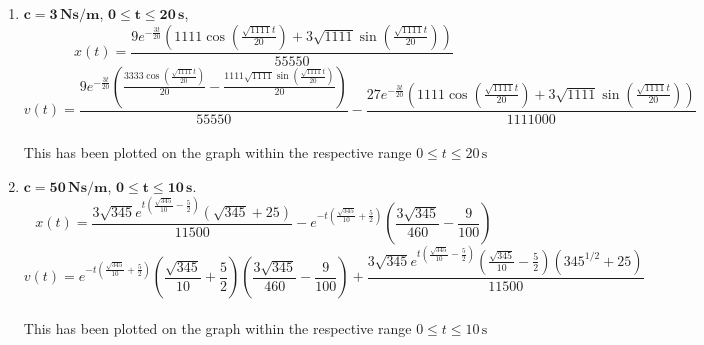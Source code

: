 \documentclass[a4paper, 12pt]{report}
\begin{document}
    \begin{enumerate}[itemsep=1em,label=\textbf{\arabic*.}]
    \item \(\bm{c = 3} \, \textbf{Ns/m}\), \(\bm{0 \leq t \leq 20} \, \textbf{s}\),
        \[x(t) = \frac{9 e^{-\frac{3t}{20}} \left( 1111 \cos\left(\frac{\sqrt{1111} t}{20}\right) + 3 \sqrt{1111} \sin\left(\frac{\sqrt{1111} t}{20}\right) \right)}{55550}\]
        \[v(t) = \frac{9 e^{-\frac{3t}{20}} \left( \frac{3333 \cos\left(\frac{\sqrt{1111} t}{20}\right)}{20} - \frac{1111\sqrt{1111} \sin\left(\frac{\sqrt{1111} t}{20}\right)}{20} \right)}{55550} - \frac{27 e^{-\frac{3t}{20}} \left( 1111 \cos\left(\frac{\sqrt{1111} t}{20}\right) + 3 \sqrt{1111} \sin\left(\frac{\sqrt{1111} t}{20}\right) \right)}{1111000}\]\\[1.5em]
        This has been plotted on the graph within the respective range \({0 \leq t \leq 20} \, \text{s}\)
    \item \(\bm{c = 50} \, \textbf{Ns/m}\), \(\bm{0 \leq t \leq 10} \, \textbf{s}\).
        \[x(t) = \frac{3 \sqrt{345} e^{t\left(\frac{\sqrt{345}}{10} - \frac{5}{2}\right)} \left( \sqrt{345} + 25 \right)}{11500} - e^{-t\left(\frac{\sqrt{345}}{10} + \frac{5}{2}\right)} \left( \frac{3\sqrt{345}}{460} - \frac{9}{100} \right)\]
        \[v(t) = e^{-t\left(\frac{\sqrt{345}}{10} + \frac{5}{2}\right)}\left(\frac{\sqrt{345}}{10} + \frac{5}{2}\right)\left( \frac{3\sqrt{345}}{460} - \frac{9}{100} \right) + \frac{3\sqrt{345} e^{t\left(\frac{\sqrt{345}}{10} - \frac{5}{2}\right)}\left(\frac{\sqrt{345}}{10} - \frac{5}{2}\right)\left(345^{1/2} + 25\right)} {11500}\]\\[1.5em]
        This has been plotted on the graph within the respective range \({0 \leq t \leq 10} \, \text{s}\)
\end{enumerate}



\newpage
\end{document}
